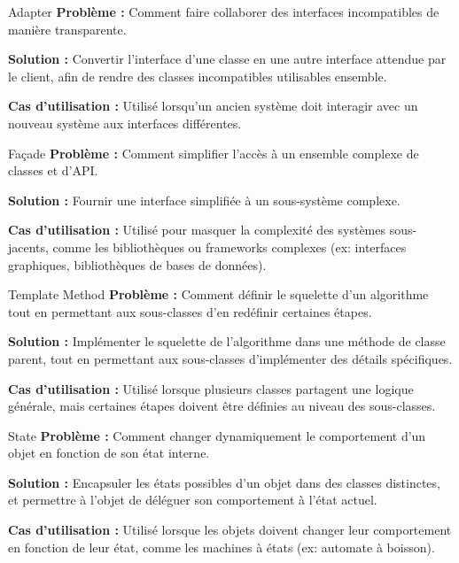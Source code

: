 \documentclass[aspectratio=169]{beamer}
\begin{document}
\begin{frame}{Adapter}
    \textbf{Problème :} 
    Comment faire collaborer des interfaces incompatibles de manière transparente.

    \textbf{Solution :} 
    Convertir l'interface d'une classe en une autre interface attendue par le client, afin de rendre des classes incompatibles utilisables ensemble.

    \textbf{Cas d'utilisation :}
    Utilisé lorsqu'un ancien système doit interagir avec un nouveau système aux interfaces différentes.
\end{frame}

\begin{frame}{Façade}
    \textbf{Problème :} 
    Comment simplifier l'accès à un ensemble complexe de classes et d'API.

    \textbf{Solution :} 
    Fournir une interface simplifiée à un sous-système complexe.

    \textbf{Cas d'utilisation :}
    Utilisé pour masquer la complexité des systèmes sous-jacents, comme les bibliothèques ou frameworks complexes (ex: interfaces graphiques, bibliothèques de bases de données).
\end{frame}

\begin{frame}{Template Method}
    \textbf{Problème :} 
    Comment définir le squelette d'un algorithme tout en permettant aux sous-classes d'en redéfinir certaines étapes.

    \textbf{Solution :} 
    Implémenter le squelette de l'algorithme dans une méthode de classe parent, tout en permettant aux sous-classes d'implémenter des détails spécifiques.

    \textbf{Cas d'utilisation :}
    Utilisé lorsque plusieurs classes partagent une logique générale, mais certaines étapes doivent être définies au niveau des sous-classes.
\end{frame}

\begin{frame}{State}
    \textbf{Problème :} 
    Comment changer dynamiquement le comportement d'un objet en fonction de son état interne.

    \textbf{Solution :} 
    Encapsuler les états possibles d'un objet dans des classes distinctes, et permettre à l'objet de déléguer son comportement à l'état actuel.

    \textbf{Cas d'utilisation :}
    Utilisé lorsque les objets doivent changer leur comportement en fonction de leur état, comme les machines à états (ex: automate à boisson).
\end{frame}
\end{document}
